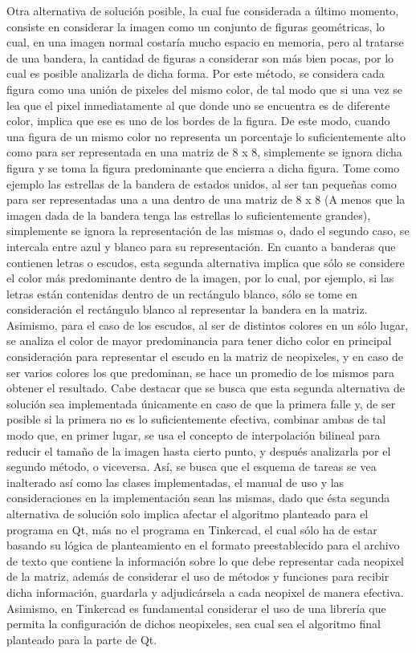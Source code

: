 \documentclass{article}
\begin{document}
Otra alternativa de solución posible, la cual fue considerada a último momento, consiste en considerar la imagen como un conjunto de figuras geométricas, lo cual, en una imagen normal costaría mucho espacio en memoria, pero al tratarse de una bandera, la cantidad de figuras a considerar son más bien pocas, por lo cual es posible analizarla de dicha forma. Por este método, se considera cada figura como una unión de pixeles del mismo color, de tal modo que si una vez se lea que el pixel inmediatamente al que donde uno se encuentra es de diferente color, implica que ese es uno de los bordes de la figura. De este modo, cuando una figura de un mismo color no representa un porcentaje lo suficientemente alto como para ser representada en una matriz de 8 x 8, simplemente se ignora dicha figura y se toma la figura predominante que encierra a dicha figura. Tome como ejemplo las estrellas de la bandera de estados unidos, al ser tan pequeñas como para ser representadas una a una dentro de una matriz de 8 x 8 (A menos que la imagen dada de la bandera tenga las estrellas lo suficientemente grandes), simplemente se ignora la representación de las mismas o, dado el segundo caso, se intercala entre azul y blanco para su representación. En cuanto a banderas que contienen letras o escudos, esta segunda alternativa implica que sólo se considere el color más predominante dentro de la imagen, por lo cual, por ejemplo, si las letras están contenidas dentro de un rectángulo blanco, sólo se tome en consideración el rectángulo blanco al representar la bandera en la matriz. Asimismo, para el caso de los escudos, al ser de distintos colores en un sólo lugar, se analiza el color de mayor predominancia para tener dicho color en principal consideración para representar el escudo en la matriz de neopixeles, y en caso de ser varios colores los que predominan, se hace un promedio de los mismos para obtener el resultado. Cabe destacar que se busca que esta segunda alternativa de solución sea implementada únicamente en caso de que la primera falle y, de ser posible si la primera no es lo suficientemente efectiva, combinar ambas de tal modo que, en primer lugar, se usa el concepto de interpolación bilineal para reducir el tamaño de la imagen hasta cierto punto, y después analizarla por el segundo método, o viceversa. Así, se busca que el esquema de tareas se vea inalterado así como las clases implementadas, el manual de uso y las consideraciones en la implementación sean las mismas, dado que ésta segunda alternativa de solución solo implica afectar el algoritmo planteado para el programa en Qt, más no el programa en Tinkercad, el cual sólo ha de estar basando su lógica de planteamiento en el formato preestablecido para el archivo de texto que contiene la información sobre lo que debe representar cada neopixel de la matriz, además de considerar el uso de métodos y funciones para recibir dicha información, guardarla y adjudicársela a cada neopixel de manera efectiva. Asimismo, en Tinkercad es fundamental considerar el uso de una librería que permita la configuración de dichos neopixeles, sea cual sea el algoritmo final planteado para la parte de Qt.
\end{document}
